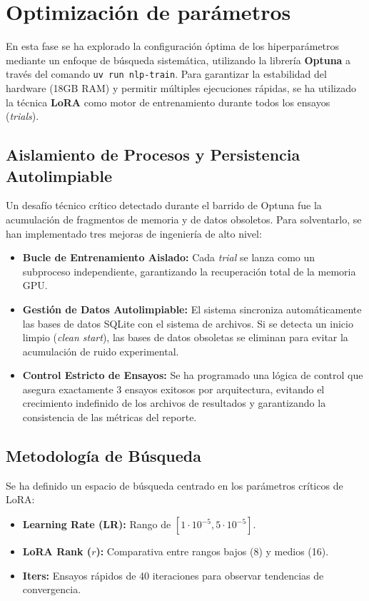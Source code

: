 \section{Optimización de parámetros}

En esta fase se ha explorado la configuración óptima de los hiperparámetros mediante un enfoque de búsqueda sistemática, utilizando la librería \textbf{Optuna} a través del comando \texttt{uv run nlp-train}. Para garantizar la estabilidad del hardware (18GB RAM) y permitir múltiples ejecuciones rápidas, se ha utilizado la técnica \textbf{LoRA} como motor de entrenamiento durante todos los ensayos (\textit{trials}).

\subsection{Aislamiento de Procesos y Persistencia Autolimpiable}

Un desafío técnico crítico detectado durante el barrido de Optuna fue la acumulación de fragmentos de memoria y de datos obsoletos. Para solventarlo, se han implementado tres mejoras de ingeniería de alto nivel:
\begin{itemize}
    \item \textbf{Bucle de Entrenamiento Aislado:} Cada \textit{trial} se lanza como un subproceso independiente, garantizando la recuperación total de la memoria GPU.
    \item \textbf{Gestión de Datos Autolimpiable:} El sistema sincroniza automáticamente las bases de datos SQLite con el sistema de archivos. Si se detecta un inicio limpio (\textit{clean start}), las bases de datos obsoletas se eliminan para evitar la acumulación de ruido experimental.
    \item \textbf{Control Estricto de Ensayos:} Se ha programado una lógica de control que asegura exactamente 3 ensayos exitosos por arquitectura, evitando el crecimiento indefinido de los archivos de resultados y garantizando la consistencia de las métricas del reporte.
\end{itemize}


\subsection{Metodología de Búsqueda}

Se ha definido un espacio de búsqueda centrado en los parámetros críticos de LoRA:
\begin{itemize}
    \item \textbf{Learning Rate (LR):} Rango de $[1\cdot 10^{-5}, 5\cdot 10^{-5}]$.
    \item \textbf{LoRA Rank ($r$):} Comparativa entre rangos bajos (8) y medios (16).
    \item \textbf{Iters:} Ensayos rápidos de 40 iteraciones para observar tendencias de convergencia.
\end{itemize}

